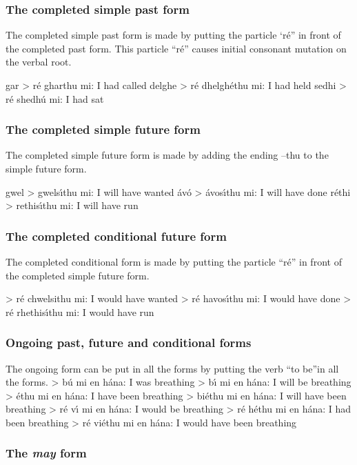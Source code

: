 \subsubsection{The completed simple past form}

The completed simple past form is made by putting the particle ‘r\'{e}” in front of the completed past form. This particle “r\'{e}” causes initial consonant mutation on the verbal root.

gar > r\'{e} gharthu mi: I had called
delghe > r\'{e} dhelgh\'{e}thu mi: I had held
sedhi > r\'{e} shedh\'{u} mi: I had sat

\subsubsection{The completed simple future form}

The completed simple future form is made by adding the ending –thu to the simple future form.

gwel > gwels\'{\i}thu mi: I will have wanted
\'{a}v\'{o} > \'{a}vos\'{\i}thu mi: I will have done
r\'{e}thi > rethis\'{\i}thu mi: I will have run

\subsubsection{The completed conditional future form}

The completed conditional form is made by putting the particle “r\'{e}” in front of the completed simple future form.

> r\'{e} chwelsithu mi: I would have wanted
> r\'{e} havos\'{\i}thu mi: I would have done
> r\'{e} rhethis\'{\i}thu mi: I would have run

\subsubsection{Ongoing past, future and conditional forms}

The ongoing form can be put in all the forms by putting the verb “to be”in all the forms.
> b\'{u} mi en h\'{a}na: I was breathing
> b\'{\i} mi en h\'{a}na: I will be breathing
> \'{e}thu mi en h\'{a}na: I have been breathing
> bi\'{e}thu mi en h\'{a}na: I will have been breathing
> r\'{e} v\'{\i} mi en h\'{a}na: I would be breathing
> r\'{e} h\'{e}thu mi en h\'{a}na: I had been breathing
> r\'{e} vi\'{e}thu mi en h\'{a}na: I would have been breathing

\subsubsection{The \textit{may} form}

